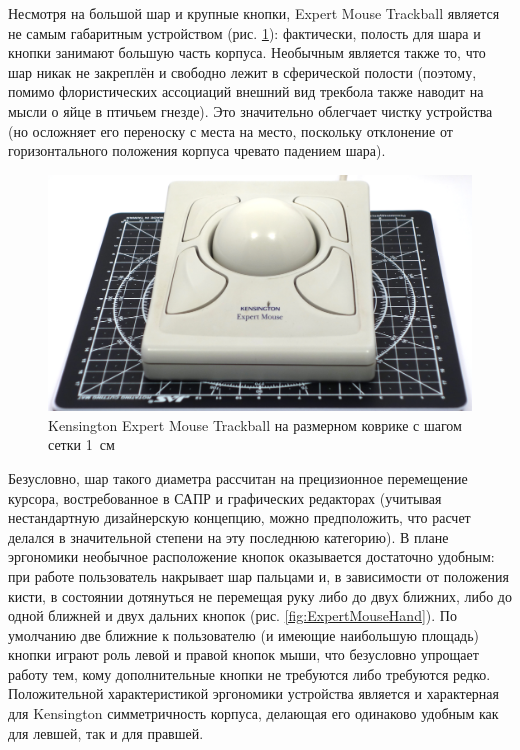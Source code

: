\documentclass[11pt, a4paper]{article}
\begin{document}
Несмотря на большой шар и крупные кнопки, Expert Mouse Trackball является не самым габаритным устройством (рис. \ref{fig:ExpertMouseSize}): фактически, полость для шара и кнопки занимают большую часть корпуса. Необычным является также то, что шар никак не закреплён и свободно лежит в сферической полости (поэтому, помимо флористических ассоциаций внешний вид трекбола также наводит на мысли о яйце в птичьем гнезде). Это значительно облегчает чистку устройства (но осложняет его переноску с места на место, поскольку  отклонение от горизонтального положения корпуса чревато падением шара).

\begin{figure}[h]
    \centering
    \includegraphics[scale=0.3]{1996_kensington_expert_trackball_5/size_30.jpg}
    \caption{Kensington Expert Mouse Trackball на размерном коврике с шагом сетки 1~см}
    \label{fig:ExpertMouseSize}
\end{figure}

Безусловно, шар такого диаметра рассчитан на прецизионное перемещение курсора, востребованное в САПР и графических редакторах (учитывая нестандартную дизайнерскую концепцию, можно предположить, что расчет делался в значительной степени на эту последнюю категорию). В плане эргономики необычное расположение кнопок оказывается достаточно удобным: при работе пользователь накрывает шар пальцами и, в зависимости от положения кисти, в состоянии дотянуться не перемещая руку либо до двух ближних, либо до одной ближней и двух дальних кнопок (рис. \ref{fig:ExpertMouseHand}). По умолчанию две ближние к пользователю (и имеющие наибольшую площадь) кнопки играют роль левой и правой кнопок мыши, что безусловно упрощает работу тем, кому дополнительные кнопки не требуются либо требуются редко. Положительной характеристикой эргономики устройства является и характерная для Kensington  симметричность корпуса, делающая его одинаково удобным как для левшей, так и для правшей.
\end{document}
